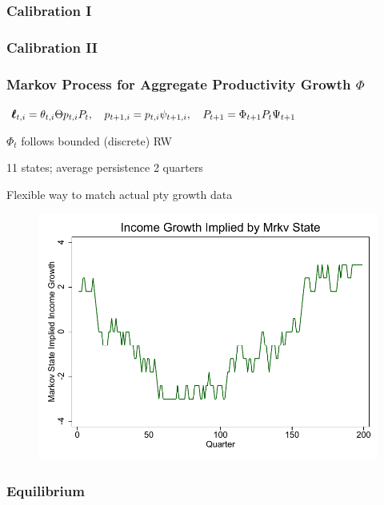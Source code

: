 \documentclass{beamer}\usepackage{dcolumn}
\begin{document}
\normalsize

\begin{frame}[noframenumbering]
\frametitle{Calibration I}
\label{calibration1}
\small


\hyperlink{key_parameters}{}

\end{frame}

\begin{frame}[noframenumbering]
\frametitle{Calibration II}
\small


\hyperlink{key_parameters}{}
\end{frame}

\begin{frame}[noframenumbering]
  \frametitle{Markov Process for Aggregate Productivity Growth $\Phi$}

$
\pmb{\ell}_{t,i} = \theta_{t,i}\Theta p_{t,i} {P}_{t},\quad
p_{t+1,i} =  {{p}}_{t,i} \psi_{t+1,i},  \quad
 {P}_{t+1} =  \Phi_{t+1} {P}_{t}\Psi_{t+1}
$
\bi
\item $\Phi_t$ follows bounded (discrete) RW
\item 11 states; average persistence 2 quarters
\item Flexible way to match actual pty growth data
\ei
  \begin{figure}
\begin{center}
\includegraphics[width=.75\textwidth]{../Figures/MrkvStateGrowth}
\end{center}
\end{figure}

\end{frame}

\begin{frame}[noframenumbering]
\frametitle{Equilibrium}

\footnotesize


\end{frame}
\end{document}
